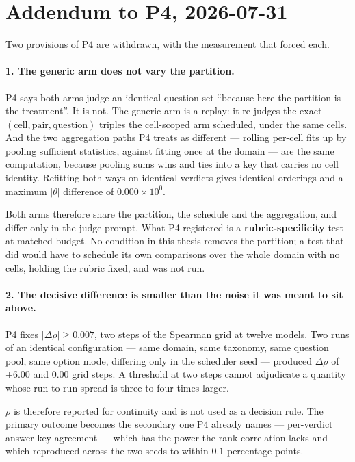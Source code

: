 \section{Addendum to P4, 2026-07-31}\label{sec:prereg-addendum-p4}

Two provisions of P4 are withdrawn, with the measurement that forced each.

\paragraph{1. The generic arm does not vary the partition.} P4 says both arms
judge an identical question set ``because here the partition is the treatment''.
It is not. The generic arm is a replay: it re-judges the exact
$(\text{cell}, \text{pair}, \text{question})$ triples the cell-scoped arm
scheduled, under the same cells. And the two aggregation paths P4 treats as
different --- rolling per-cell fits up by pooling sufficient statistics, against
fitting once at the domain --- are the same computation, because pooling sums
wins and ties into a key that carries no cell identity. Refitting both ways on
identical verdicts gives identical orderings and a maximum $|\theta|$ difference
of $0.000 \times 10^{0}$.

Both arms therefore share the partition, the schedule and the aggregation, and
differ only in the judge prompt. What P4 registered is a
\textbf{rubric-specificity} test at matched budget. No condition in this thesis
removes the partition; a test that did would have to schedule its own
comparisons over the whole domain with no cells, holding the rubric fixed, and
was not run.

\paragraph{2. The decisive difference is smaller than the noise it was meant to
sit above.} P4 fixes $|\Delta\rho| \geq 0.007$, two steps of the Spearman grid
at twelve models. Two runs of an identical configuration --- same domain, same
taxonomy, same question pool, same option mode, differing only in the scheduler
seed --- produced $\Delta\rho$ of $+6.00$ and $0.00$ grid steps. A threshold at
two steps cannot adjudicate a quantity whose run-to-run spread is three to four
times larger.

$\rho$ is therefore reported for continuity and is not used as a decision rule.
The primary outcome becomes the secondary one P4 already names --- per-verdict
answer-key agreement --- which has the power the rank correlation lacks and
which reproduced across the two seeds to within $0.1$ percentage points.

